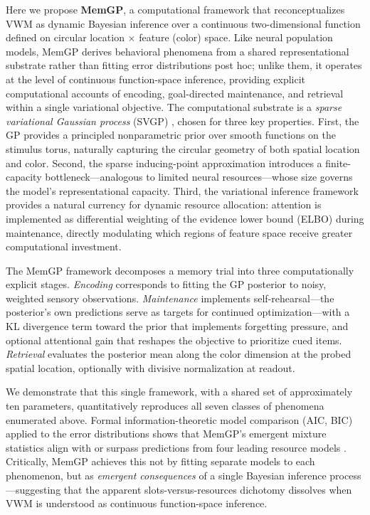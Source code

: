 \documentclass[11pt,letterpaper]{article}
\begin{document}
Here we propose \textbf{MemGP}, a computational framework that reconceptualizes VWM as dynamic Bayesian inference over a continuous two-dimensional function defined on circular location $\times$ feature (color) space. Like neural population models, MemGP derives behavioral phenomena from a shared representational substrate rather than fitting error distributions post hoc; unlike them, it operates at the level of continuous function-space inference, providing explicit computational accounts of encoding, goal-directed maintenance, and retrieval within a single variational objective. The computational substrate is a \emph{sparse variational Gaussian process} (SVGP) \cite{tiaoHandbookSparseVariational2019, leibfriedTutorialSparseGaussian2022}, chosen for three key properties. First, the GP provides a principled nonparametric prior over smooth functions on the stimulus torus, naturally capturing the circular geometry of both spatial location and color. Second, the sparse inducing-point approximation introduces a finite-capacity bottleneck---analogous to limited neural resources---whose size governs the model's representational capacity. Third, the variational inference framework provides a natural currency for dynamic resource allocation: attention is implemented as differential weighting of the evidence lower bound (ELBO) during maintenance, directly modulating which regions of feature space receive greater computational investment.

The MemGP framework decomposes a memory trial into three computationally explicit stages. \emph{Encoding} corresponds to fitting the GP posterior to noisy, weighted sensory observations. \emph{Maintenance} implements self-rehearsal---the posterior's own predictions serve as targets for continued optimization---with a KL divergence term toward the prior that implements forgetting pressure, and optional attentional gain that reshapes the objective to prioritize cued items. \emph{Retrieval} evaluates the posterior mean along the color dimension at the probed spatial location, optionally with divisive normalization at readout.

We demonstrate that this single framework, with a shared set of approximately ten parameters, quantitatively reproduces all seven classes of phenomena enumerated above. Formal information-theoretic model comparison (AIC, BIC) applied to the error distributions shows that MemGP's emergent mixture statistics align with or surpass predictions from four leading resource models \cite{vandenbergVariabilityEncodingPrecision2012}. Critically, MemGP achieves this not by fitting separate models to each phenomenon, but as \emph{emergent consequences} of a single Bayesian inference process---suggesting that the apparent slots-versus-resources dichotomy dissolves when VWM is understood as continuous function-space inference.
\end{document}
